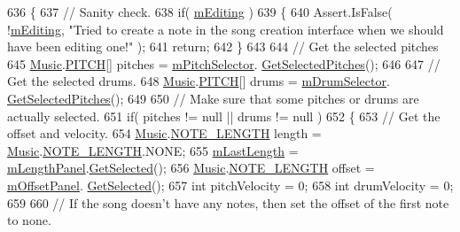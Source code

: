 \begin{DoxyCode}
636     \{
637         \textcolor{comment}{// Sanity check.}
638         \textcolor{keywordflow}{if}( \hyperlink{group___s_c_priv_var_ga5aec1c6ae4159b96ce466ee6b1da3371}{mEditing} )
639         \{
640             Assert.IsFalse( !\hyperlink{group___s_c_priv_var_ga5aec1c6ae4159b96ce466ee6b1da3371}{mEditing}, \textcolor{stringliteral}{"Tried to create a note in the song creation interface when
       we should have been editing one!"} );
641             \textcolor{keywordflow}{return};
642         \}
643 
644         \textcolor{comment}{// Get the selected pitches}
645         \hyperlink{class_music}{Music}.\hyperlink{group___music_enums_ga508f69b199ea518f935486c990edac1d}{PITCH}[] pitches = \hyperlink{group___s_c_priv_var_gac32e68713b2b504807f52acef445df1c}{mPitchSelector}.
      \hyperlink{group___s_c_handlers_gac7a3634aba275f03dffe9f45e444dbf1}{GetSelectedPitches}();
646 
647         \textcolor{comment}{// Get the selected drums.}
648         \hyperlink{class_music}{Music}.\hyperlink{group___music_enums_ga508f69b199ea518f935486c990edac1d}{PITCH}[] drums = \hyperlink{group___s_c_priv_var_ga3f1c71d8cabe505745220d728c6f97bc}{mDrumSelector}.
      \hyperlink{group___s_c_handlers_gac7a3634aba275f03dffe9f45e444dbf1}{GetSelectedPitches}();
649 
650         \textcolor{comment}{// Make sure that some pitches or drums are actually selected.}
651         \textcolor{keywordflow}{if}( pitches != null || drums != null )
652         \{
653             \textcolor{comment}{// Get the offset and velocity.}
654             \hyperlink{class_music}{Music}.\hyperlink{group___music_enums_gaf11b5f079adbb21c800b9eca1c5c3cbd}{NOTE\_LENGTH} length = \hyperlink{class_music}{Music}.\hyperlink{group___music_enums_gaf11b5f079adbb21c800b9eca1c5c3cbd}{NOTE\_LENGTH}.NONE;
655             \hyperlink{group___s_c_priv_var_ga220707a4bf66dc6fee4e7bc9b7f2ed60}{mLastLength} = \hyperlink{group___s_c_priv_var_ga370237b50bc11a581fc963cdd8ffd4ea}{mLengthPanel}.\hyperlink{group___s_c_handlers_gac1a7dd19ee5cf14d87a09e803432acd1}{GetSelected}();
656             \hyperlink{class_music}{Music}.\hyperlink{group___music_enums_gaf11b5f079adbb21c800b9eca1c5c3cbd}{NOTE\_LENGTH} offset = \hyperlink{group___s_c_priv_var_gafeeda8ab122f574c6fff94814234334c}{mOffsetPanel}.
      \hyperlink{group___s_c_handlers_gac1a7dd19ee5cf14d87a09e803432acd1}{GetSelected}();
657             \textcolor{keywordtype}{int} pitchVelocity = 0;
658             \textcolor{keywordtype}{int} drumVelocity = 0;
659 
660             \textcolor{comment}{// If the song doesn't have any notes, then set the offset of the first note to none.}

\end{DoxyCode}
